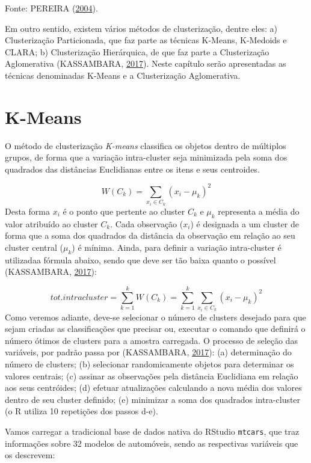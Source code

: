 \documentclass[12pt,brazil,oneside]{book}
\begin{document}
Fonte: PEREIRA (\protect\hyperlink{ref-Pereira2004}{2004}).

Em outro sentido, existem vários métodos de clusterização, dentre eles: a) Clusterização Particionada, que faz parte as técnicas K-Means, K-Medoids e CLARA; b) Clusterização Hierárquica, de que faz parte a Clusterização Aglomerativa (KASSAMBARA, \protect\hyperlink{ref-Kassambara2017}{2017}). Neste capítulo serão apresentadas as técnicas denominadas K-Means e a Clusterização Aglomerativa.

\hypertarget{k-means}{%
\section{K-Means}\label{k-means}}

O método de clusterização \emph{K-means} classifica os objetos dentro de múltiplos grupos, de forma que a variação intra-cluster seja minimizada pela soma dos quadrados das distâncias Euclidianas entre os itens e seus centroides.

\[
W(C_k)=\sum _{x_i\in C_k}(x_i-\mu _k)^2
\]
Desta forma \(x_i\) é o ponto que pertente ao cluster \(C_k\) e \(\mu _k\) representa a média do valor atribuído ao cluster \(C_k\). Cada observação (\(x_i\)) é designada a um cluster de forma que a soma dos quadrados da distância da observação em relação ao seu cluster central (\(\mu _k\)) é mínima. Ainda, para definir a variação intra-cluster é utilizadaa fórmula abaixo, sendo que deve ser tão baixa quanto o possível (KASSAMBARA, \protect\hyperlink{ref-Kassambara2017}{2017}):

\[
tot.intracluster=\sum_{k=1}^{k} W(C_k)=\sum_{k=1}^{k}\sum _{x_i\in C_k}(x_i-\mu _k)^2
\]
Como veremos adiante, deve-se selecionar o número de clusters desejado para que sejam criadas as classificações que precisar ou, executar o comando que definirá o número ótimos de clusters para a amostra carregada. O processo de seleção das variáveis, por padrão passa por (KASSAMBARA, \protect\hyperlink{ref-Kassambara2017}{2017}): (a) determinação do número de clusters; (b) selecionar randomicamente objetos para determinar os valores centrais; (c) assinar as observações pela distância Euclidiana em relação aos seus centróides; (d) efetuar atualizações calculando a nova média dos valores dentro de seu cluster definido; (e) minimizar a soma dos quadrados intra-cluster (o R utiliza 10 repetições dos passos d-e).

Vamos carregar a tradicional base de dados nativa do RStudio \texttt{mtcars}, que traz informações sobre 32 modelos de automóveis, sendo as respectivas variáveis que os descrevem:
\end{document}
